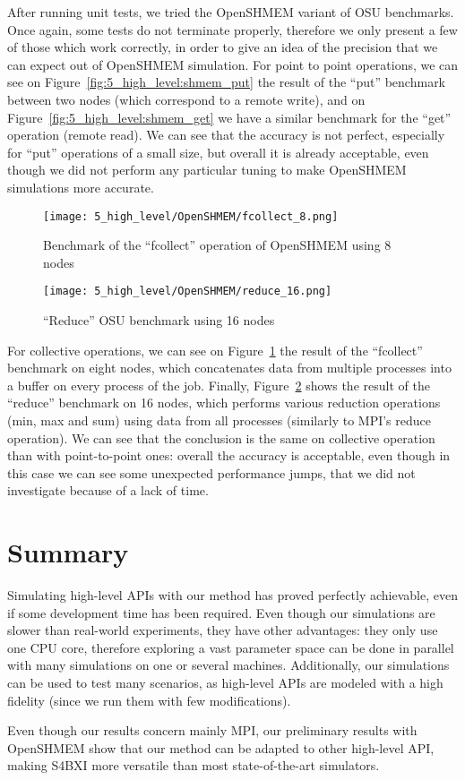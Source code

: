 After running unit tests, we tried the OpenSHMEM variant of OSU benchmarks. Once
again, some tests do not terminate properly, therefore we only present a few of
those which work correctly, in order to give an idea of the precision that we
can expect out of OpenSHMEM simulation. For point to point operations, we can
see on Figure~\ref{fig:5_high_level:shmem_put} the result of the ``put''
benchmark between two nodes (which correspond to a remote write), and on
Figure~\ref{fig:5_high_level:shmem_get} we have a similar benchmark for the
``get'' operation (remote read). We can see that the accuracy is not perfect,
especially for ``put'' operations of a small size, but overall it is already
acceptable, even though we did not perform any particular tuning to make
OpenSHMEM simulations more accurate.

\begin{figure}[!hb]
    \centering
    \texttt{[image: 5\_high\_level/OpenSHMEM/fcollect\_8.png]}
    \caption{Benchmark of the ``fcollect'' operation of OpenSHMEM using 8 nodes}
    \label{fig:5_high_level:shmem_fcollect}
\end{figure}

\begin{figure}[!hb]
    \centering
    \texttt{[image: 5\_high\_level/OpenSHMEM/reduce\_16.png]}
    \caption{``Reduce'' OSU benchmark using 16 nodes}
    \label{fig:5_high_level:shmem_reduce}
\end{figure}

For collective operations, we can see on
Figure~\ref{fig:5_high_level:shmem_fcollect} the result of the ``fcollect''
benchmark on eight nodes, which concatenates data from multiple processes into a
buffer on every process of the job. Finally,
Figure~\ref{fig:5_high_level:shmem_reduce} shows the result of the ``reduce''
benchmark on 16 nodes, which performs various reduction operations (min, max and
sum) using data from all processes (similarly to MPI's reduce operation). We can
see that the conclusion is the same on collective operation than with
point-to-point ones: overall the accuracy is acceptable, even though in this
case we can see some unexpected performance jumps, that we did not investigate
because of a lack of time.

\section{Summary}

Simulating high-level APIs with our method has proved perfectly achievable, even
if some development time has been required. Even though our simulations are
slower than real-world experiments, they have other advantages: they only use
one CPU core, therefore exploring a vast parameter space can be done in parallel
with many simulations on one or several machines. Additionally, our simulations
can be used to test many scenarios, as high-level APIs are modeled with a high
fidelity (since we run them with few modifications).

Even though our results concern mainly MPI, our preliminary results with
OpenSHMEM show that our method can be adapted to other high-level API, making
S4BXI more versatile than most state-of-the-art simulators.
